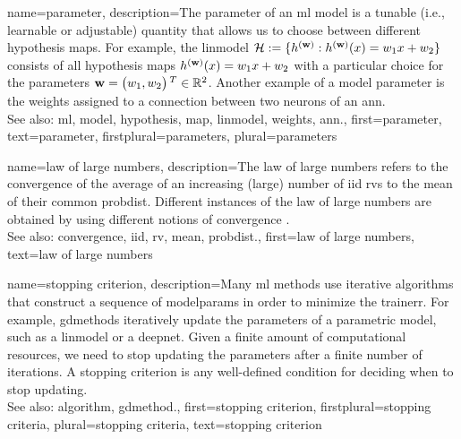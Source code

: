 {name={parameter},
	description={The parameter of an \gls{ml} \gls{model} is a tunable (i.e., learnable or adjustable) quantity that 
		allows us to choose between different \gls{hypothesis} \glspl{map}. For example, the \gls{linmodel} 
		$\mathcal{H} := \{h^{({\bf w})}: h^{({\bf w})}(x)= w_{1} x + w_{2}\}$ 
		consists of all \gls{hypothesis} \glspl{map} $h^{({\bf w})}(x)= w_{1} x + w_{2}$ 
		with a particular choice for the parameters ${\bf w} = \big(w_{1},w_{2}\big)\,^{T} \in \mathbb{R}^{2}$. 
		Another example of a \gls{model} parameter is the \gls{weights} assigned to a connection between two neurons of an \gls{ann}.
				\\
		See also: \gls{ml}, \gls{model}, \gls{hypothesis}, \gls{map}, \gls{linmodel}, \gls{weights}, \gls{ann}.},
	first={parameter},
	text={parameter},
	firstplural={parameters}, 
 	plural={parameters}
}

{name={law of large numbers},
	description={The law of large numbers refers to the 
		\gls{convergence} of the average of an increasing (large) number of \gls{iid} \glspl{rv} 
		to the \gls{mean} of their common \gls{probdist}. Different instances of the 
		law of large numbers are obtained by using different notions of \gls{convergence} \cite{papoulis}.
				\\
		See also: \gls{convergence}, \gls{iid}, \gls{rv}, \gls{mean}, \gls{probdist}.},
	first={law of large numbers},
	text={law of large numbers}
}
    
{name={stopping criterion},
	description={Many \gls{ml} methods use iterative \glspl{algorithm} 
		that construct a sequence of \gls{modelparams} in order to minimize the \gls{trainerr}. 
		For example, \glspl{gdmethod} iteratively update the \glspl{parameter} of a parametric \gls{model}, 
		such as a \gls{linmodel} or a \gls{deepnet}. Given a finite amount of computational 
		resources, we need to stop updating the \glspl{parameter} after a finite number of iterations. 
		A stopping criterion is any well-defined condition for deciding when to stop updating.
				\\
		See also: \gls{algorithm}, \gls{gdmethod}.},
	first={stopping criterion},
	firstplural={stopping criteria},
	plural={stopping criteria}, 
	text={stopping criterion}
}

